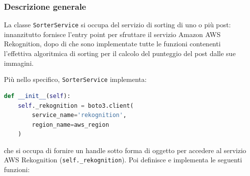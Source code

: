\subsubsection{Descrizione generale}
La classe \verb+SorterService+ si occupa del servizio di sorting di uno o più post: innanzitutto fornisce l'entry point per sfruttare il servizio Amazon AWS Rekognition, dopo di che sono implementate tutte le funzioni contenenti l'effettiva algoritmica di sorting per il calcolo del punteggio del post dalle sue immagini.

Più nello specifico, \verb+SorterService+ implementa:
\begin{lstlisting}[language=Python]
def __init__(self):
    self._rekognition = boto3.client(
        service_name='rekognition', 
        region_name=aws_region
    )
\end{lstlisting} 
che si occupa di fornire un handle sotto forma di oggetto per accedere al servizio AWS Rekognition
(\verb+self._rekognition+). 
Poi definisce e implementa le seguenti funzioni:
